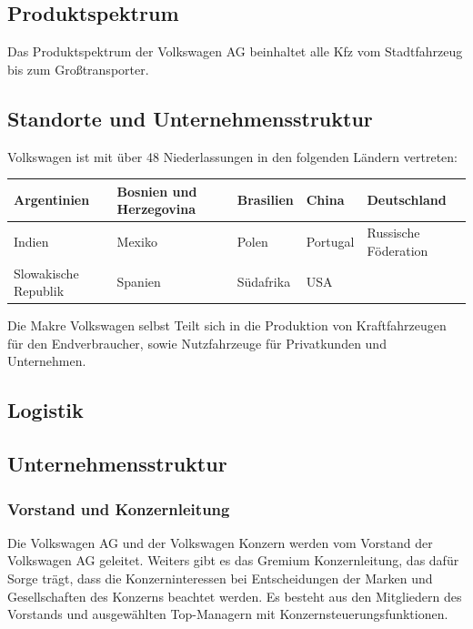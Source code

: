 \documentclass[12pt]{article}
\begin{document}
\subsection{Produktspektrum}
Das Produktspektrum der Volkswagen AG beinhaltet alle Kfz vom Stadtfahrzeug bis zum Großtransporter.

\subsection{Standorte und Unternehmensstruktur}
Volkswagen ist mit über 48 Niederlassungen in den folgenden Ländern vertreten:

\begin{table}[h]
	\begin{tabular}{|l|l|l|l|l|}
		\hline
		Argentinien          & Bosnien und Herzegovina & Brasilien & China    & Deutschland          \\ \hline
		Indien               & Mexiko                  & Polen     & Portugal & Russische Föderation \\ \hline
		Slowakische Republik & Spanien                 & Südafrika & USA      &                      \\ \hline
	\end{tabular}
\end{table}

Die Makre Volkswagen selbst Teilt sich in die Produktion von Kraftfahrzeugen für den Endverbraucher, sowie Nutzfahrzeuge für Privatkunden und Unternehmen.

\subsection{Logistik}
\newpage
\subsection{Unternehmensstruktur}
\subsubsection{Vorstand und Konzernleitung}
Die Volkswagen AG und der Volkswagen Konzern werden vom Vorstand der Volkswagen AG geleitet.
Weiters gibt es das Gremium Konzernleitung, das dafür Sorge trägt, dass die Konzerninteressen bei Entscheidungen der Marken und Gesellschaften des Konzerns beachtet werden. Es besteht aus den Mitgliedern des Vorstands und ausgewählten Top-Managern mit Konzernsteuerungsfunktionen.
\end{document}
